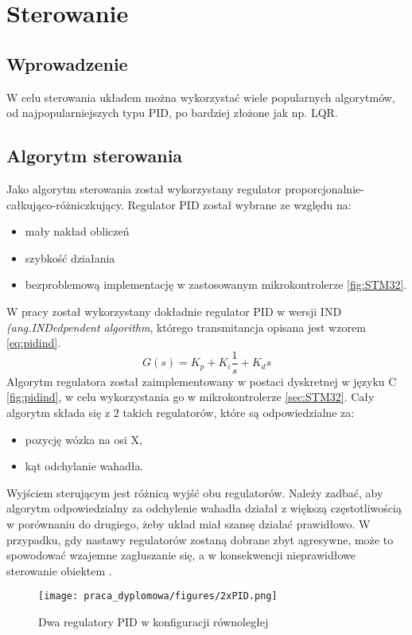 \chapter{Sterowanie}

\section{Wprowadzenie}
W celu sterowania układem można wykorzystać wiele popularnych algorytmów, od najpopularniejszych typu PID, po bardziej złożone jak np. LQR.

\section{Algorytm sterowania}
Jako algorytm sterowania został wykorzystany regulator proporcjonalnie-całkująco-różniczkujący. Regulator PID został wybrane ze względu na:
\begin{itemize}
    \item mały nakład obliczeń
    \item szybkość działania
    \item bezproblemową implementację w zastosowanym mikrokontrolerze \ref{fig:STM32}.
\end{itemize} 
W pracy został wykorzystany dokładnie regulator PID w wersji IND \textit{(ang.INDedpendent algorithm}, którego transmitancja opisana jest wzorem \ref{eq:pidind}.
\begin{equation}
    G(s)=K_p+K_i\frac{1}{s}+K_ds
    \label{eq:pidind}
\end{equation}
Algorytm regulatora został zaimplementowany w postaci dyskretnej w języku C \ref{fig:pidind}, w celu wykorzystania go w mikrokontrolerze \ref{sec:STM32}.
Cały algorytm składa się z 2 takich regulatorów, które są odpowiedzialne za:
\begin{itemize}
    \item pozycję wózka na osi X,
    \item kąt odchylanie wahadła.
\end{itemize}
Wyjściem sterującym jest różnicą wyjść obu regulatorów. Należy zadbać, aby algorytm odpowiedzialny za odchylenie wahadła działał z większą częstotliwością w porównaniu do drugiego, żeby układ miał szansę działać prawidłowo. W przypadku, gdy nastawy regulatorów zostaną dobrane zbyt agresywne, może to spowodować wzajemne zagłuszanie się, a w konsekwencji nieprawidłowe sterowanie obiektem \cite{odwWah}. 

\begin{figure}
    \centering
    \texttt{[image: praca\_dyplomowa/figures/2xPID.png]}
    \caption{Dwa regulatory PID w konfiguracji równoległej}
    \label{fig:sim}
\end{figure}






